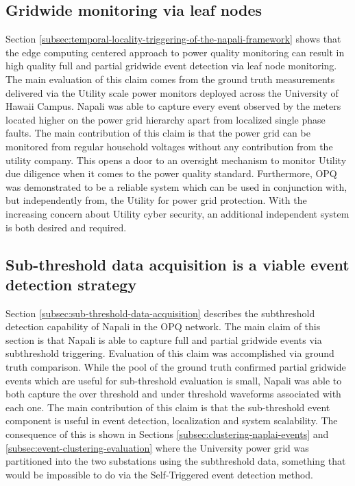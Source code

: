 \subsection{Gridwide monitoring via leaf nodes}\label{subsec:conc:gridwide-monitoring-via-leaf-nodes}
Section \ref{subsec:temporal-locality-triggering-of-the-napali-framework} shows that the edge computing centered approach to power quality monitoring can result in high quality
full and partial gridwide event detection via leaf node monitoring.
The main evaluation of this claim comes from the ground truth measurements delivered via the Utility scale power monitors deployed across the University of Hawaii Campus.
Napali was able to capture every event observed by the meters located higher on the power grid hierarchy apart from localized single phase faults.
The main contribution of this claim is that the power grid can be monitored from regular household voltages without any contribution from the utility company.
This opens a door to an oversight mechanism to monitor Utility due diligence when it comes to the power quality standard.
Furthermore, OPQ was demonstrated to be a reliable system which can be used in conjunction with, but independently from, the Utility for power grid protection.
With the increasing concern about Utility cyber security, an additional independent system is both desired and required.

\subsection{Sub-threshold data acquisition is a viable event detection strategy}\label{subsec:conc:sub-threshold-data-acquisition}
Section \ref{subsec:sub-threshold-data-acquisition} describes the subthreshold detection capability of Napali in the OPQ network.
The main claim of this section is that Napali is able to capture full and partial gridwide events via subthreshold triggering.
Evaluation of this claim was accomplished via ground truth comparison.
While the pool of the ground truth confirmed partial gridwide events which are useful for sub-threshold evaluation is small,
Napali was able to both capture the over threshold and under threshold waveforms associated with each one.
The main contribution of this claim is that the sub-threshold event component is useful in event detection, localization and system scalability.
The consequence of this is shown in Sections \ref{subsec:clustering-naplai-events} and \ref{subsec:event-clustering-evaluation}
where the University power grid was partitioned into the two substations using the subthreshold data, something that would be impossible to do via the Self-Triggered event detection method.


